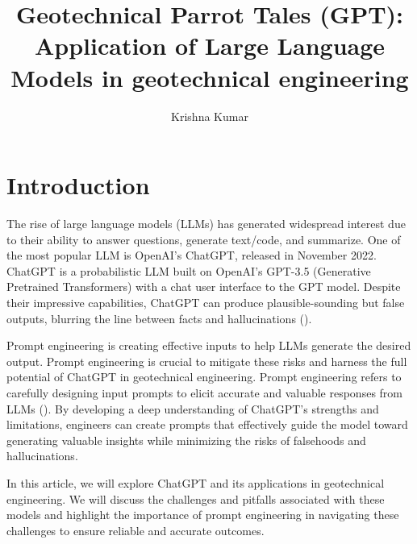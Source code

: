 \documentclass{article}
\title {Geotechnical Parrot Tales (GPT): Application of Large Language Models in geotechnical engineering}
\author{Krishna Kumar}
\date{}
\begin{document}
\maketitle

\section{Introduction}
The rise of large language models (LLMs) has generated widespread interest due to their ability to answer questions, generate text/code, and summarize. One of the most popular LLM is OpenAI's ChatGPT, released in November 2022. ChatGPT is a probabilistic LLM built on OpenAI's GPT-3.5 (Generative Pretrained Transformers) with a chat user interface to the GPT model. Despite their impressive capabilities, ChatGPT can produce plausible-sounding but false outputs, blurring the line between facts and hallucinations (\cite{bender2021dangers}).

Prompt engineering is creating effective inputs to help LLMs generate the desired output. Prompt engineering is crucial to mitigate these risks and harness the full potential of ChatGPT in geotechnical engineering. Prompt engineering refers to carefully designing input prompts to elicit accurate and valuable responses from LLMs (\cite{petroni2020context}). By developing a deep understanding of ChatGPT's strengths and limitations, engineers can create prompts that effectively guide the model toward generating valuable insights while minimizing the risks of falsehoods and hallucinations.

In this article, we will explore ChatGPT and its applications in geotechnical engineering. We will discuss the challenges and pitfalls associated with these models and highlight the importance of prompt engineering in navigating these challenges to ensure reliable and accurate outcomes.
\end{document}
